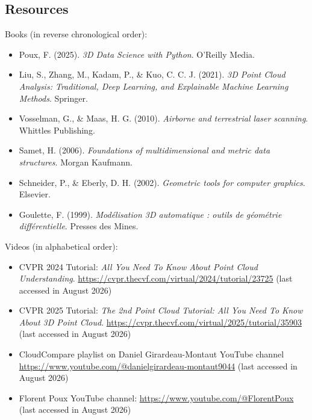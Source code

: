 \subsection{Resources}

Books (in reverse chronological order):

\begin{itemize}
\item Poux, F. (2025). \textit{3D Data Science with Python}. O'Reilly Media.
\item Liu, S., Zhang, M., Kadam, P., \& Kuo, C. C. J. (2021). \textit{3D Point Cloud Analysis: Traditional, Deep Learning, and Explainable Machine Learning Methods}. Springer.
\item Vosselman, G., \& Maas, H. G. (2010). \textit{Airborne and terrestrial laser scanning}. Whittles Publishing.
\item Samet, H. (2006). \textit{Foundations of multidimensional and metric data structures}. Morgan Kaufmann.
\item Schneider, P., \& Eberly, D. H. (2002). \textit{Geometric tools for computer graphics}. Elsevier.
\item Goulette, F. (1999). \textit{Modélisation 3D automatique : outils de géométrie différentielle}. Presses des Mines.
\end{itemize}

Videos (in alphabetical order):

\begin{itemize}
\item CVPR 2024 Tutorial: \textit{All You Need To Know About Point Cloud Understanding}. \url{https://cvpr.thecvf.com/virtual/2024/tutorial/23725} (last accessed in August 2026)
\item CVPR 2025 Tutorial: \textit{The 2nd Point Cloud Tutorial: All You Need To Know About 3D Point Cloud}. \url{https://cvpr.thecvf.com/virtual/2025/tutorial/35903} (last accessed in August 2026)
\item CloudCompare playlist on Daniel Girardeau-Montaut YouTube channel \url{https://www.youtube.com/@danielgirardeau-montaut9044} (last accessed in August 2026)
\item Florent Poux YouTube channel: \url{https://www.youtube.com/@FlorentPoux} (last accessed in August 2026)
\end{itemize}
